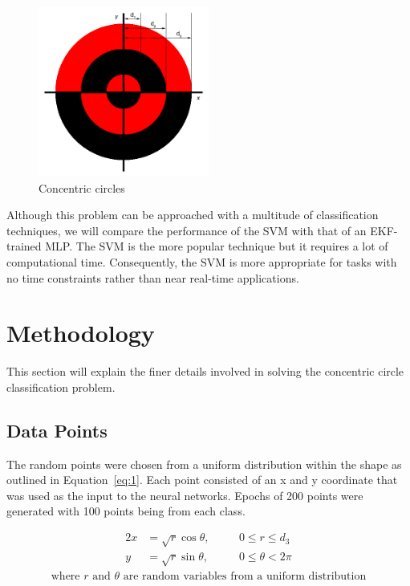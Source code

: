 \documentclass[11pt,letterpaper,titlepage]{article}
\numberwithin{equation}{section}
\numberwithin{figure}{section}
\numberwithin{table}{section}
\begin{document}
\begin{figure}[!ht]
  \centering
  \includegraphics[width=0.5\textwidth]{img/concentric_circles}
  \caption{Concentric circles}
  \label{fig:concentric_circles}
\end{figure}

Although this problem can be approached with a multitude of classification techniques, we will compare the performance of the SVM with that of an EKF-trained MLP. The SVM is the more popular technique but it requires a lot of computational time. Consequently, the SVM is more appropriate for tasks with no time constraints rather than near real-time applications.

\section{Methodology}
\label{sec:methodology}

This section will explain the finer details involved in solving the concentric circle classification problem.

\subsection{Data Points}
\label{sec:data-points}

The random points were chosen from a uniform distribution within the shape as outlined in Equation~\eqref{eq:1}. Each point consisted of an x and y coordinate that was used as the input to the neural networks. Epochs of 200 points were generated with 100 points being from each class.

\begin{samepage}
\begin{alignat}{2}
  \label{eq:1}
  x &= \sqrt{r} \cos{\theta}, &\quad& 0 \leq r \leq d_3 \\
  y &= \sqrt{r} \sin{\theta}, && 0 \leq \theta < 2\pi \nonumber
\end{alignat}
\begin{gather}
  \text{where \(r\) and \(\theta\) are random variables from a uniform distribution} \nonumber
\end{gather}
\end{samepage}
\end{document}
